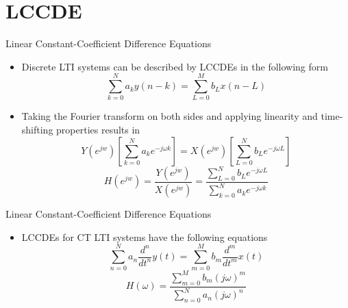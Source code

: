 \section{LCCDE}

\begin{frame}{Linear Constant-Coefficient Difference Equations}

    \begin{itemize}
        \item Discrete LTI systems can be described by LCCDEs in the following form
            \[
                \sum_{k=0}^N a_{k}y(n-k) = \sum_{L=0}^M b_{L}x(n-L)
            \]
        \item Taking the Fourier transform on both sides and applying linearity and time-shifting properties results in
            \[
                Y(e^{jw})[\sum_{k=0}^N a_{k}e^{-j\omega k}] = X(e^{jw})[\sum_{L=0}^N b_{L}e^{-j\omega L}]
            \]
            \[
                H(e^{jw}) = \frac{Y(e^{jw})}{X(e^{jw})} = \frac{\sum_{L=0}^N b_{L}e^{-j\omega L}}{\sum_{k=0}^N a_{k}e^{-j\omega k}}
            \]
    \end{itemize}

\end{frame}

\begin{frame}{Linear Constant-Coefficient Difference Equations}
    \begin{itemize}
        \item LCCDEs for CT LTI systems have the following equations
            \[
                \sum_{n=0}^N a_n \frac{d^{n}}{dt^n} y(t) = \sum_{m=0}^M b_m \frac{d^{m}}{dt^m} x(t)
            \]
            \[
                H(\omega) = \frac{\sum_{m=0}^M b_m (j\omega)^m} {\sum_{n=0}^N a_n (j\omega)^n}
            \]
    \end{itemize}

\end{frame}
